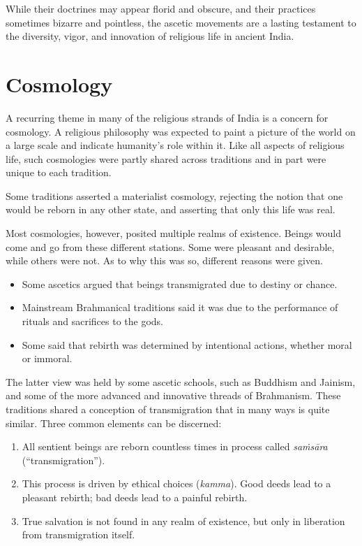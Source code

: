 \documentclass[12pt,openany]{book}%
\begin{document}
While their doctrines may appear florid and obscure, and their practices sometimes bizarre and pointless, the ascetic movements are a lasting testament to the diversity, vigor, and innovation of religious life in ancient India.

\section*{Cosmology}

A recurring theme in many of the religious strands of India is a concern for cosmology. A religious philosophy was expected to paint a picture of the world on a large scale and indicate humanity’s role within it. Like all aspects of religious life, such cosmologies were partly shared across traditions and in part were unique to each tradition.

Some traditions asserted a materialist cosmology, rejecting the notion that one would be reborn in any other state, and asserting that only this life was real.

Most cosmologies, however, posited multiple realms of existence. Beings would come and go from these different stations. Some were pleasant and desirable, while others were not. As to why this was so, different reasons were given.

\begin{itemize}%
\item Some ascetics argued that beings transmigrated due to destiny or chance.%
\item Mainstream Brahmanical traditions said it was due to the performance of rituals and sacrifices to the gods.%
\item Some said that rebirth was determined by intentional actions, whether moral or immoral.%
\end{itemize}

The latter view was held by some ascetic schools, such as Buddhism and Jainism, and some of the more advanced and innovative threads of Brahmanism. These traditions shared a conception of transmigration that in many ways is quite similar. Three common elements can be discerned:

\begin{enumerate}%
\item All sentient beings are reborn countless times in process called \textit{\textsanskrit{saṁsāra}} (“transmigration”).%
\item This process is driven by ethical choices (\textit{kamma}). Good deeds lead to a pleasant rebirth; bad deeds lead to a painful rebirth.%
\item True salvation is not found in any realm of existence, but only in liberation from transmigration itself.%
\end{enumerate}
\end{document}
